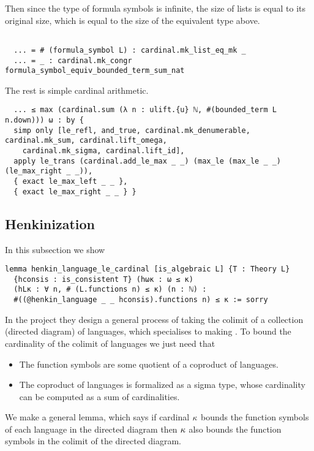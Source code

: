 Then since the type of formula symbols is infinite,
the size of lists is equal to its original size,
which is equal to the size of the equivalent type above.

\begin{lstlisting}

  ... = # (formula_symbol L) : cardinal.mk_list_eq_mk _
  ... = _ : cardinal.mk_congr formula_symbol_equiv_bounded_term_sum_nat \end{lstlisting}

The rest is simple cardinal arithmetic.

\begin{lstlisting}
  ... ≤ max (cardinal.sum (λ n : ulift.{u} ℕ, #(bounded_term L n.down))) ω : by {
  simp only [le_refl, and_true, cardinal.mk_denumerable, cardinal.mk_sum, cardinal.lift_omega,
    cardinal.mk_sigma, cardinal.lift_id],
  apply le_trans (cardinal.add_le_max _ _) (max_le (max_le _ _) (le_max_right _ _)),
  { exact le_max_left _ _ },
  { exact le_max_right _ _ } } \end{lstlisting}

\subsection{Henkinization}


In this subsection we show

\begin{lstlisting}
lemma henkin_language_le_cardinal [is_algebraic L] {T : Theory L}
  {hconsis : is_consistent T} (hωκ : ω ≤ κ)
  (hLκ : ∀ n, # (L.functions n) ≤ κ) (n : ℕ) :
  #((@henkin_language _ _ hconsis).functions n) ≤ κ := sorry \end{lstlisting}

In the  project they design a general process of taking the colimit
of a collection (directed diagram) of languages,
which specialises to making .
To bound the cardinality of the colimit of languages we just need that
\begin{itemize}
  \item The function symbols are some quotient of a coproduct of languages.
  \item The coproduct of languages is formalized as a sigma type,
        whose cardinality can be computed as a sum of cardinalities.
\end{itemize}

We make a general lemma,
which says if cardinal $\kappa$ bounds the function symbols of each language
in the directed diagram then $\kappa$ also bounds
the function symbols in the colimit of the directed diagram.

